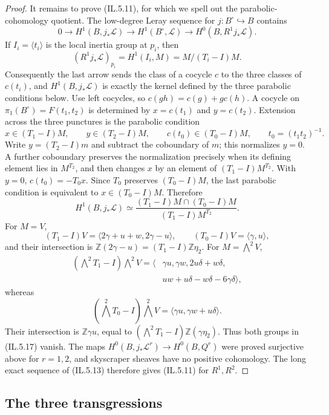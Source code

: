 \begin{proof}
It remains to prove (IL.5.11), for which we spell out the parabolic-cohomology
quotient.  The low-degree Leray sequence for \(j:B^\circ\hookrightarrow B\)
contains
\[
 0\longrightarrow H^1(B,j_*\mathcal L)
 \longrightarrow H^1(B^\circ,\mathcal L)
 \longrightarrow H^0(B,R^1j_*\mathcal L).
\]
If \(I_i=\langle t_i\rangle\) is the local inertia group at \(p_i\), then
\[
 (R^1j_*\mathcal L)_{p_i}
 =H^1(I_i,M)=M/(T_i-I)M.
\]
Consequently the last arrow sends the class of a cocycle \(c\) to the three
classes of \(c(t_i)\), and \(H^1(B,j_*\mathcal L)\) is exactly the kernel
defined by the three parabolic conditions below.  Use left cocycles, so
\(c(gh)=c(g)+g c(h)\).  A cocycle on
\(\pi_1(B^\circ)=F(t_1,t_2)\) is determined by
\(x=c(t_1)\) and \(y=c(t_2)\).  Extension across the three punctures is the
parabolic condition
\[
 x\in(T_1-I)M,\qquad y\in(T_2-I)M,\qquad
 c(t_0)\in(T_0-I)M,
 \qquad t_0=(t_1t_2)^{-1}.
\]
Write \(y=(T_2-I)m\) and subtract the coboundary of \(m\); this normalizes
\(y=0\).  A further coboundary preserves the normalization precisely when
its defining element lies in \(M^{T_2}\), and then changes \(x\) by an
element of \((T_1-I)M^{T_2}\).  With \(y=0\),
\(c(t_0)=-T_0x\).  Since \(T_0\) preserves
\((T_0-I)M\), the last parabolic condition is equivalent to
\(x\in(T_0-I)M\).  Therefore
\[
 H^1(B,j_*\mathcal L)\simeq
 \frac{(T_1-I)M\cap(T_0-I)M}{(T_1-I)M^{T_2}}.
\tag{IL.5.17}
\]
For \(M=V\),
\[
(T_1-I)V=\langle2\gamma+u+w,2\gamma-u\rangle,\qquad
(T_0-I)V=\langle\gamma,u\rangle,
\]
and their intersection is
\(\mathbb Z(2\gamma-u)=(T_1-I)\mathbb Z\eta_2\).  For
\(M=\bigwedge^2V\),
\[
\begin{aligned}
(\textstyle\bigwedge^2T_1-I)\textstyle\bigwedge^2V
=\langle&\gamma u,\gamma w,2u\delta+w\delta,\\
&uw+u\delta-w\delta-6\gamma\delta\rangle,
\end{aligned}
\]
whereas
\[
(\textstyle\bigwedge^2T_0-I)\textstyle\bigwedge^2V
=\langle\gamma u,\gamma w+u\delta\rangle.
\]
Their intersection is \(\mathbb Z\gamma u\), equal to
\((\bigwedge^2T_1-I)\mathbb Z(\gamma\eta_2)\).  Thus both groups in
(IL.5.17) vanish.  The maps
\(H^0(B,j_*\mathcal L^r)\to H^0(B,Q^r)\) were proved surjective above for
\(r=1,2\), and skyscraper sheaves have no positive cohomology.  The long
exact sequence of (IL.5.13) therefore gives (IL.5.11) for \(R^1,R^2\).
\end{proof}

\subsection{The three transgressions}

